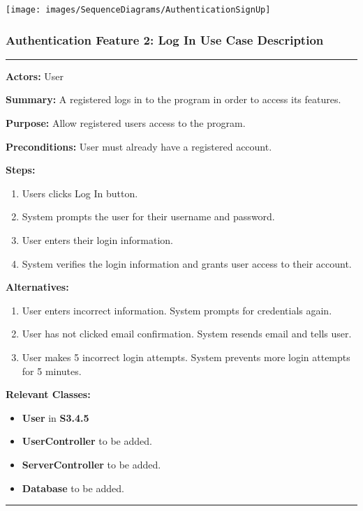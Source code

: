 \documentclass[twoside,letterpaper]{article}
\begin{document}
\bigskip

\texttt{[image: images/SequenceDiagrams/AuthenticationSignUp]}

\newpage

\subsubsection[Authentication Feature 2: Log In Use Case Description]{\rmfamily\bfseries\color{black}
	Authentication Feature 2: Log In Use Case Description}
\hypertarget{RefHeading22059017292}{}

\hrule
\vspace{8pt}
\noindent\textbf{Actors:} User \newline

\noindent\textbf{Summary:} A registered logs in to the program in order to access its features.  \newline

\noindent\textbf{Purpose:} Allow registered users access to the program.  \newline

\noindent\textbf{Preconditions:} User must already have a registered account.  \newline

\noindent\textbf{Steps:}
\begin{enumerate}
	\item Users clicks Log In button.
	\item System prompts the user for their username and password.
	\item User enters their login information.
	\item System verifies the login information and grants user access to their account.
\end{enumerate}
\noindent\textbf{Alternatives:}
	\begin{enumerate}
		\item User enters incorrect information. System prompts for credentials again.
		\item User has not clicked email confirmation. System resends email and tells user.
		\item User makes 5 incorrect login attempts. System prevents more login attempts for 5 minutes.
	\end{enumerate}

\noindent\textbf{Relevant Classes:}
\begin{itemize}
	\item \textbf{User} in \textbf{S3.4.5}
	\item \textbf{UserController} to be added.
	\item \textbf{ServerController} to be added.
	\item \textbf{Database} to be added.
\end{itemize}
\vspace{8pt}
\hrule
\newpage
\end{document}
